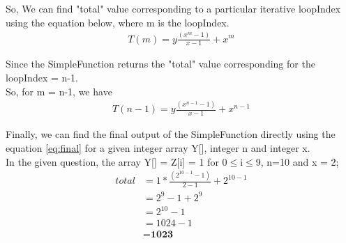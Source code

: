 \documentclass[journal,12pt,twocolumn]{IEEEtran}
\begin{document}
So, We can find "total" value corresponding to a particular iterative loopIndex using the equation below, where m is the loopIndex.
\begin{gather}
    T(m) = y\frac{(x^{m} - 1)}{x - 1} + x^{m}
\end{gather}

Since the SimpleFunction returns the "total" value corresponding for the loopIndex = n-1.\\
So, for m = n-1, we have \\
\begin{gather}
    T(n-1) = y\frac{(x^{n-1} - 1)}{x - 1} + x^{n-1} \label{eq:final}
\end{gather}

Finally, we can find the final output of the SimpleFunction directly using the equation \ref{eq:final} for a given integer array Y[], integer n and integer x.\\

 In the given question, the array Y[] = Z[i] = 1 for 0$\le$i$\le$9, n=10 and x = 2;
\begin{align}
    total &= 1*\frac{(2^{10-1} - 1)}{2 - 1} + 2^{10-1} \\ 
    & = 2^{9} - 1 + 2^{9} \\
    &= 2^{10} - 1 \\
    &= 1024 - 1 \\
    &= \textbf{1023} 
\end{align}
\end{document}
